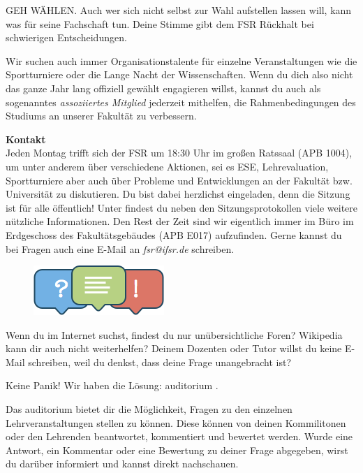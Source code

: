GEH WÄHLEN.
Auch wer sich nicht selbst zur Wahl aufstellen lassen will, kann was für seine Fachschaft tun.
Deine Stimme gibt dem FSR Rückhalt bei schwierigen Entscheidungen.

Wir suchen auch immer Organisationstalente für einzelne Veranstaltungen wie die Sportturniere oder die Lange Nacht der Wissenschaften.
Wenn du dich also nicht das ganze Jahr lang offiziell gewählt engagieren willst, kannst du auch als sogenanntes \textit{assoziiertes Mitglied} jederzeit mithelfen, die Rahmenbedingungen des Studiums an unserer Fakultät zu verbessern.

\textbf{Kontakt} \\
Jeden Montag trifft sich der FSR um 18:30 Uhr im großen Ratssaal (APB 1004), um unter anderem über verschiedene Aktionen, sei es ESE, Lehrevaluation, Sportturniere aber auch über Probleme und Entwicklungen an der Fakultät bzw. Universität zu diskutieren.
Du bist dabei herzlichst eingeladen, denn die Sitzung ist für alle öffentlich! Unter  findest du neben den Sitzungsprotokollen viele weitere nützliche Informationen.
Den Rest der Zeit sind wir eigentlich immer im Büro im Erdgeschoss des Fakultätsgebäudes (APB E017) aufzufinden.
Gerne kannst du bei Fragen auch eine E-Mail an \textit{fsr@ifsr.de} schreiben.


\begin{figure}
\includegraphics[width=.95\linewidth]{img/auditorium_logo}
\end{figure}

Wenn du im Internet suchst, findest du nur unübersichtliche Foren?
Wikipedia kann dir auch nicht weiterhelfen?
Deinem Dozenten oder Tutor willst du keine E-Mail schreiben, weil du denkst, dass deine Frage unangebracht ist?

Keine Panik!
Wir haben die Lösung: auditorium .

Das auditorium bietet dir die Möglichkeit, Fragen zu den einzelnen Lehrveranstaltungen stellen zu können.
Diese können von deinen Kommilitonen oder den Lehrenden beantwortet, kommentiert und bewertet werden.
Wurde eine Antwort, ein Kommentar oder eine Bewertung zu deiner Frage abgegeben, wirst du darüber informiert und kannst direkt nachschauen.

